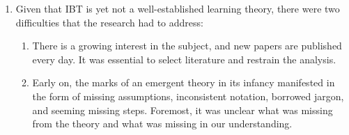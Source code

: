 \documentclass[
  letterpaper,
  a4paper,
  12pt,
  twoside,
  brazil,
  british,
  open=right]{scrbook}
\begin{document}
\begin{enumerate}
\def\labelenumi{\arabic{enumi}.}
\item
  Given that {IBT} is yet not a well-established learning theory, there
  were two difficulties that the research had to address:

  \begin{enumerate}
  \def\labelenumii{\arabic{enumii}.}
  \item
    There is a growing interest in the subject, and new papers are
    published every day. It was essential to select literature and
    restrain the analysis.
  \item
    Early on, the marks of an emergent theory in its infancy manifested
    in the form of missing assumptions, inconsistent notation, borrowed
    jargon, and seeming missing steps. Foremost, it was unclear what was
    missing from the theory and what was missing in our understanding.
  \end{enumerate}


\end{enumerate}
\end{document}
